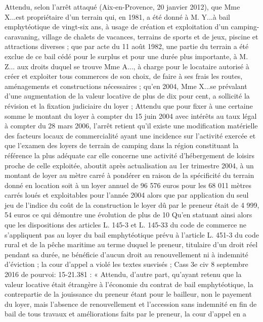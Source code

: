 \documentclass[11pt,a4paper]{report}
\begin{document}
	Attendu, selon l'arrêt attaqué (Aix-en-Provence, 20 janvier 2012), que Mme X...est propriétaire d'un terrain
	qui, en 1981, a été donné à M. Y...à bail emphytéotique de vingt-six ans, à usage de création et exploitation
	d'un camping-caravaning, village de chalets de vacances, terrains de sports et de jeux, piscine et attractions
	diverses ; que par acte du 11 août 1982, une partie du terrain a été exclue de ce bail cédé pour le surplus et
	pour une durée plus importante, à M. Z... aux droits duquel se trouve Mme A..., à charge pour le locataire
	autorisé à créer et exploiter tous commerces de son choix, de faire à ses frais les routes, aménagements et
	constructions nécessaires ; qu'en 2004, Mme X...se prévalant d'une augmentation de la valeur locative de plus
	de dix pour cent, a sollicité la révision et la fixation judiciaire du loyer ;
	Attendu que pour fixer à une certaine somme le montant du loyer à compter du 15 juin 2004 avec intérêts au
	taux légal à compter du 28 mars 2006, l'arrêt retient qu'il existe une modification matérielle des facteurs
	locaux de commercialité ayant une incidence sur l'activité exercée et que l'examen des loyers de terrain de
	camping dans la région constituant la référence la plus adéquate car elle concerne une activité
	d'hébergement de loisirs proche de celle exploitée, aboutit après actualisation au 1er trimestre 2004, à un
	montant de loyer au mètre carré à pondérer en raison de la spécificité du terrain donné en location soit à un
	loyer annuel de 96 576 euros pour les 68 011 mètres carrés loués et exploitables pour l'année 2004 alors que
	par application du seul jeu de l'indice du coût de la construction le loyer dû par le preneur était de 4 999, 54
	euros ce qui démontre une évolution de plus de 10 %
	Qu'en statuant ainsi alors que les dispositions des articles L. 145-3 et L. 145-33 du code de commerce ne
	s'appliquent pas au loyer du bail emphytéotique prévu à l'article L. 451-3 du code rural et de la pêche
	maritime au terme duquel le preneur, titulaire d'un droit réel pendant sa durée, ne bénéficie d'aucun droit au
	renouvellement ni à indemnité d'éviction ; la cour d'appel a violé les textes susvisés ;
	Cass 3e civ 8 septembre 2016 \No  de pourvoi: 15-21.381 : « Attendu, d’autre part, qu’ayant retenu que la
	valeur locative était étrangère à l’économie du contrat de bail emphytéotique, la contrepartie de la jouissance
	du preneur étant pour le bailleur, non le payement du loyer, mais l’absence de renouvellement et l’accession
	sans indemnité en fin de bail de tous travaux et améliorations faits par le preneur, la cour d’appel en a
\end{document}

